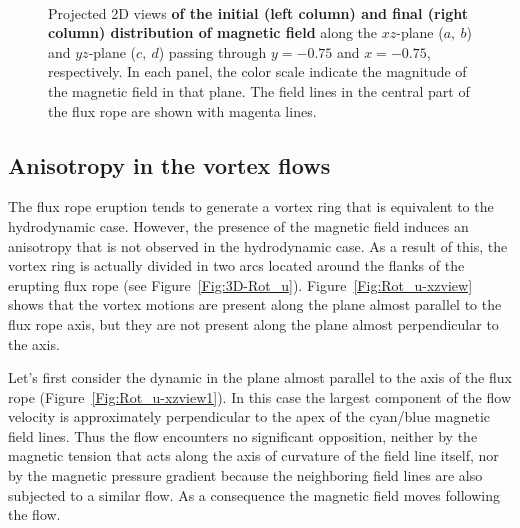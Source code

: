 \documentclass[apj]{emulateapj}
\begin{document}

\begin{figure*}
\begin{center}
\\
%
\caption{Projected 2D views \textbf{of the initial (left column) and final (right column) distribution of magnetic field} along the $xz$-plane ($a,~b$) and $yz$-plane ($c,~d$) passing through $y= -0.75$ and $x=-0.75$, respectively. In each panel, the color scale indicate the magnitude of the magnetic field in that plane. The field lines in the central part of the flux rope are shown with magenta lines.
}
\label{Fig:B_mag}
\end{center}
\end{figure*}

\subsection{Anisotropy in the vortex flows} 

The flux rope eruption tends to generate  a vortex ring that is equivalent to the hydrodynamic case. However, the presence of the magnetic field induces an anisotropy that is not observed in the hydrodynamic case. As a result of this, the vortex ring is actually divided in two arcs located around the flanks of the erupting flux rope (see Figure~\ref{Fig:3D-Rot_u}).  
Figure~\ref{Fig:Rot_u-xzview}  shows that the vortex motions are present along the plane almost parallel to the flux rope axis, but they are not present along the plane almost perpendicular to the axis. 

Let's first consider the dynamic in the plane almost parallel  to the axis of the flux rope (Figure~\ref{Fig:Rot_u-xzview1}). In this case the largest component of the flow velocity is approximately perpendicular to the apex  of the cyan/blue magnetic field lines.  Thus the flow  encounters no significant opposition, neither by the magnetic tension that acts along the axis of curvature of the field line itself, nor by the magnetic pressure gradient because the neighboring field lines are also subjected to a similar flow. As a consequence the magnetic field moves following the flow. 
\end{document}
